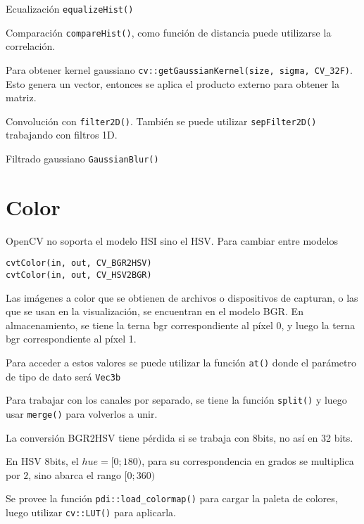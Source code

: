 \documentclass[oneside,a4paper]{book}
\begin{document}
	Ecualización \verb|equalizeHist()|

	Comparación \verb|compareHist()|, como función de distancia puede utilizarse la correlación.

	Para obtener kernel gaussiano \verb|cv::getGaussianKernel(size, sigma, CV_32F)|. Esto genera un vector, entonces se aplica el producto externo para obtener la matriz.

	Convolución con \verb|filter2D()|.
	También se puede utilizar \verb|sepFilter2D()| trabajando con filtros 1D.

	Filtrado gaussiano \verb|GaussianBlur()|


\chapter{Color}
	OpenCV no soporta el modelo HSI sino el HSV.
	Para cambiar entre modelos

	\begin{lstlisting}
cvtColor(in, out, CV_BGR2HSV)
cvtColor(in, out, CV_HSV2BGR)
	\end{lstlisting}

	Las imágenes a color que se obtienen de archivos o dispositivos de capturan, o las que se usan en la visualización, se encuentran en el modelo BGR.
	En almacenamiento, se tiene la terna bgr correspondiente al píxel 0, y luego la terna bgr correspondiente al píxel 1.
	
	Para acceder a estos valores se puede utilizar la función \verb|at()| donde el parámetro de tipo de dato será \verb|Vec3b|

	Para trabajar con los canales por separado, se tiene la función \verb|split()|
	y luego usar \verb|merge()| para volverlos a unir.

	La conversión BGR2HSV tiene pérdida si se trabaja con 8bits, no así en 32 bits.

	En HSV 8bits, el $hue = [0; 180)$, para su correspondencia en grados se multiplica por $2$, sino abarca el rango $[0; 360)$

	Se provee la función \verb|pdi::load_colormap()| para cargar la paleta de colores, luego utilizar \verb|cv::LUT()| para aplicarla.
\end{document}

